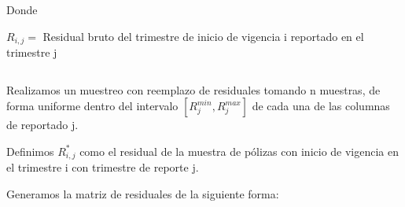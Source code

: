 \documentclass[11pt,twoside,openright,spanish]{report}
\numberwithin{equation}{chapter}
\numberwithin{figure}{chapter}
\numberwithin{table}{chapter}
\begin{document}
	\doublespacing

$ $

\doublespacing

	Donde
	\doublespacing
	
	$R_{i,j}=$ Residual bruto del trimestre de inicio de vigencia i reportado en el trimestre j
	
	\doublespacing

$ $

\doublespacing

	Realizamos un muestreo con reemplazo de residuales tomando n muestras, de forma uniforme dentro del intervalo $\left[R_{j}^{min},R_{j}^{max}\right]$ de cada una de las columnas de reportado j.
	
	\doublespacing
	
	Definimos $R_{i,j}^{*}$ como el residual de la muestra de pólizas con inicio de vigencia en el trimestre i con trimestre de reporte j. 
	
	Generamos la matriz de residuales de la siguiente forma:
	
	\doublespacing

$ $

\doublespacing
	
\end{document}
